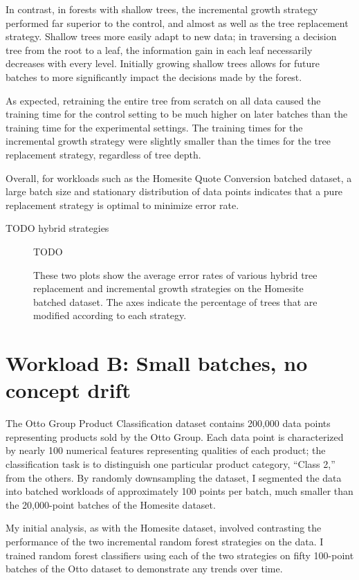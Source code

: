 In contrast, in forests with shallow trees, the incremental growth strategy
performed far superior to the control, and almost as well as the tree
replacement strategy. Shallow trees more easily adapt to new data; in
traversing a decision tree from the root to a leaf, the information gain in
each leaf necessarily decreases with every level. Initially growing shallow
trees allows for future batches to more significantly impact the decisions made
by the forest.

As expected, retraining the entire tree from scratch on all data caused the
training time for the control setting to be much higher on later batches than
the training time for the experimental settings. The training times for the
incremental growth strategy were slightly smaller than the times for the tree
replacement strategy, regardless of tree depth.

Overall, for workloads such as the Homesite Quote Conversion batched dataset, a
large batch size and stationary distribution of data points indicates that a
pure replacement strategy is optimal to minimize error rate. 

TODO hybrid strategies

\begin{figure}
  \centering
  TODO
  \caption{These two plots show the average error rates of various hybrid tree
  replacement and incremental growth strategies on the Homesite batched
dataset. The axes indicate the percentage of trees that are modified according
to each strategy.}
  \label{fig:homesitehybrid}
\end{figure}

\section{Workload B: Small batches, no concept drift}

The Otto Group Product Classification dataset contains 200,000 data points
representing products sold by the Otto Group. Each data point is characterized
by nearly 100 numerical features representing qualities of each product; the
classification task is to distinguish one particular product category, ``Class
2,'' from the others. By randomly downsampling the dataset, I segmented the
data into batched workloads of approximately 100 points per batch, much smaller
than the 20,000-point batches of the Homesite dataset. \cite{Otto}

My initial analysis, as with the Homesite dataset, involved contrasting the
performance of the two incremental random forest strategies on the data. I
trained random forest classifiers using each of the two strategies on fifty
100-point batches of the Otto dataset to demonstrate any trends over time.

